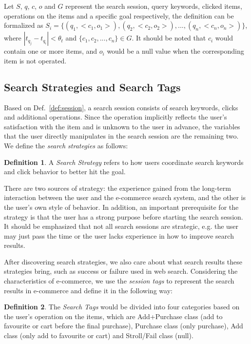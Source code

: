\documentclass[sigconf,anonymous]{acmart}
\theoremstyle{definition}
\newtheorem{mydef}{Definition}
\begin{document}
Let $S$, $q$, $c$, $o$ and $G$ represent the search session, query keywords, clicked items, operations on the items and a specific goal respectively, the definition can be formalized as $S_i=\{(q_1,<c_1,o_1>), (q_2,<c_2,o_2>), ..., (q_n,<c_n,o_n>)\}$, where $|t_{q_j}-t_{q_i}|<\theta_t$ and $\{c_1,c_2,...,c_n\}\in G$. It should be noted that $c_i$ would contain one or more items, and $o_i$ would be a null value when the corresponding item is not operated. 

\subsection{Search Strategies and Search Tags}\label{sec:definition:tag}
Based on Def.~\ref{def:session}, a search session consists of search keywords, clicks and additional operations. Since the operation implicitly reflects the user's satisfaction with the item and is unknown to the user in advance, the variables that the user directly manipulates in the search session are the remaining two. We define the \emph{search strategies} as follows:
\begin{mydef}\label{def:strategy}
A \emph{Search Strategy} refers to how users coordinate search keywords and click behavior to better hit the goal.
\end{mydef}
There are two sources of strategy: the experience gained from the long-term interaction between the user and the e-commerce search system, and the other is the user's own style of behavior. In addition, an important prerequisite for the strategy is that the user has a strong purpose before starting the search session. It should be emphasized that not all search sessions are strategic, e.g. the user may just pass the time or the user lacks experience in how to improve search results.

After discovering search strategies, we also care about what search results these strategies bring, such as success or failure used in web search. Considering the characteristics of e-commerce, we use the \emph{session tags} to represent the search results in e-commerce and define it in the following way:
\begin{mydef}\label{def:tag}
The \emph{Search Tags} would be divided into four categories based on the user's operation on the items, which are Add+Purchase class (add to favourite or cart before the final purchase), Purchase class (only purchase), Add class (only add to favourite or cart) and Stroll/Fail class (null).
\end{mydef}
\end{document}
